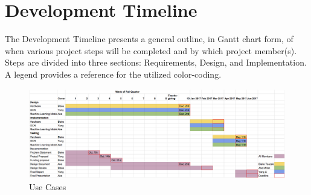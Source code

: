 \chapter{Development Timeline}
The Development Timeline presents a general outline, in Gantt chart form, of when various project steps will be completed and by which project member(s). Steps are divided into three sections: Requirements, Design, and Implementation. A legend provides a reference for the utilized color-coding.
\begin{figure}
	\label{fig:useCase}
	\centering
	\includegraphics[angle = 90, scale = 0.8]{developmentTimeline.png}
    
    \caption{Use Cases}
\end{figure}